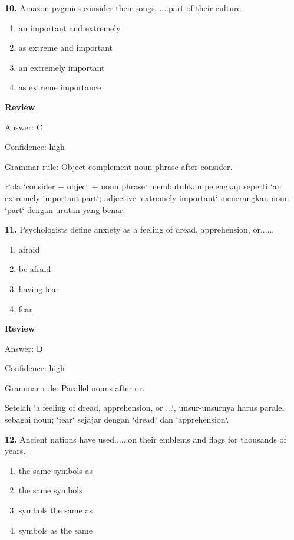 \documentclass[12pt]{article}
\begin{document}
\noindent\textbf{10.} Amazon pygmies consider their songs......part of their culture.
\begin{enumerate}[label=(\Alph*),leftmargin=*,itemsep=0.2em]
\item an important and extremely
\item as extreme and important
\item an extremely important
\item as extreme importance
\end{enumerate}
\par
\begingroup
\setlength{\parskip}{0pt}
\setlength{\parindent}{0pt}
\textbf{Review}\par
Answer: C\par
Confidence: high\par
Grammar rule: Object complement noun phrase after consider.\par
Pola `consider + object + noun phrase` membutuhkan pelengkap seperti `an extremely important part`; adjective `extremely important` menerangkan noun `part` dengan urutan yang benar.\par
\endgroup
\par
\vspace{0.25\baselineskip}
\noindent\textbf{11.} Psychologists define anxiety as a feeling of dread, apprehension, or......
\begin{enumerate}[label=(\Alph*),leftmargin=*,itemsep=0.2em]
\item afraid
\item be afraid
\item having fear
\item fear
\end{enumerate}
\par
\begingroup
\setlength{\parskip}{0pt}
\setlength{\parindent}{0pt}
\textbf{Review}\par
Answer: D\par
Confidence: high\par
Grammar rule: Parallel nouns after or.\par
Setelah `a feeling of dread, apprehension, or ...`, unsur-unsurnya harus paralel sebagai noun; `fear` sejajar dengan `dread` dan `apprehension`.\par
\endgroup
\par
\vspace{0.25\baselineskip}
\noindent\textbf{12.} Ancient nations have used......on their emblems and flags for thousands of years.
\begin{enumerate}[label=(\Alph*),leftmargin=*,itemsep=0.2em]
\item the same symbols as
\item the same symbols
\item symbols the same as
\item symbols as the same
\end{enumerate}
\end{document}
